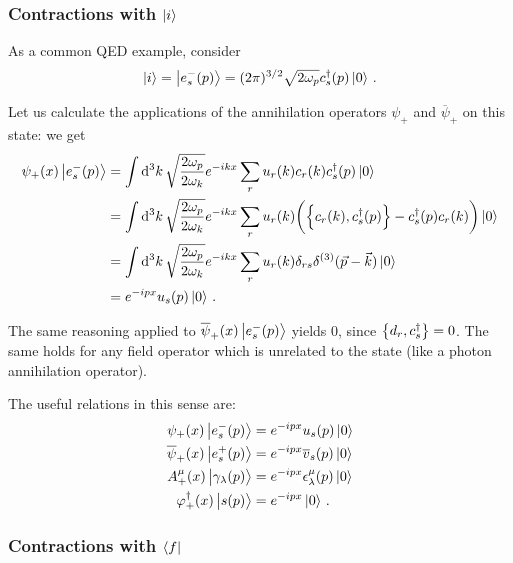 \documentclass[main.tex]{subfiles}
\begin{document}
\subsubsection{Contractions with \(\ket{i}\)}

As a common QED example, consider 
%
\begin{align}
\ket{i} = \ket{e^{-}_{s} (p)}
= (2 \pi )^{3/2}
\sqrt{2 \omega_{p}}
c_s ^\dag (p) \ket{0}
\,.
\end{align}

Let us calculate the applications 
of the annihilation operators \(\psi_{+}\) and \(\overline{\psi}_{+}\) on this state: we get 
%
\begin{align}
\psi_{+} (x) \ket{e^{-}_{s} (p)}
&= \int \dd[3]{k} \sqrt{\frac{2 \omega_{p}}{2 \omega_{k}}}
e^{-ikx} \sum_{r} u_r (k) c_r (k) c_s ^\dag (p) \ket{0}  \\
&= \int \dd[3]{k} \sqrt{\frac{2 \omega_{p}}{2 \omega_{k}}}
e^{-ikx} \sum_{r} u_r (k) \qty(\qty{ c_r (k), c_s ^\dag (p)} - c_s ^\dag (p) c_r (k)) \ket{0}  \\
&= \int \dd[3]{k} \sqrt{\frac{2 \omega_{p}}{2 \omega_{k}}}
e^{-ikx} \sum_{r} u_r (k) \delta_{rs} \delta^{(3)}(\vec{p} - \vec{k}) \ket{0}  \\
&= e^{-ipx} u_s (p) \ket{0}
\,.
\end{align}

The same reasoning applied to \(\overline{\psi}_{+}(x) \ket{e^{-}_{s}(p)}\) yields 0, since \(\qty{d_r, c_s ^\dag }= 0\). 
The same holds for any field operator which is unrelated to the state (like a photon annihilation operator). 

The useful relations in this sense are: 
%
\begin{align}
\psi_{+} (x) \ket{e^{-}_{s} (p)} &= e^{-ipx} u_s (p) \ket{0} \\
\overline{\psi}_{+} (x) \ket{e^{+}_{s} (p)} &= e^{-ipx} \overline{v}_s (p) \ket{0}  \\
A^{\mu }_{+} (x) \ket{\gamma_{\lambda } (p)} &= e^{-ipx} \epsilon^{\mu }_{\lambda } (p)\ket{0}  \\
\varphi ^\dag_{+} (x) \ket{s(p)} &= e^{-ipx} \ket{0} 
\,.
\end{align}

\subsubsection{Contractions with \(\bra{f}\)}
\end{document}
